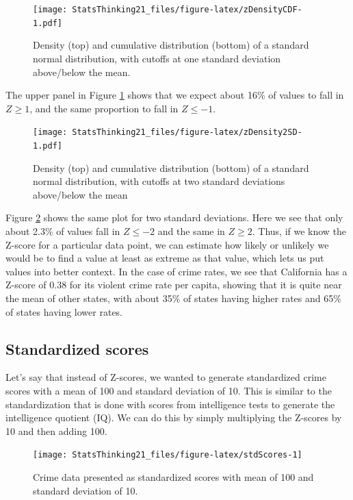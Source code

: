 \documentclass[
  12pt,
]{book}
\begin{document}
\begin{figure}
\centering
\texttt{[image: StatsThinking21\_files/figure-latex/zDensityCDF-1.pdf]}
\caption{\label{fig:zDensityCDF}Density (top) and cumulative distribution (bottom) of a standard normal distribution, with cutoffs at one standard deviation above/below the mean.}
\end{figure}

The upper panel in Figure \ref{fig:zDensityCDF} shows that we expect about 16\% of values to fall in \(Z\ge 1\), and the same proportion to fall in \(Z\le -1\).

\begin{figure}
\centering
\texttt{[image: StatsThinking21\_files/figure-latex/zDensity2SD-1.pdf]}
\caption{\label{fig:zDensity2SD}Density (top) and cumulative distribution (bottom) of a standard normal distribution, with cutoffs at two standard deviations above/below the mean}
\end{figure}

Figure \ref{fig:zDensity2SD} shows the same plot for two standard deviations. Here we see that only about 2.3\% of values fall in \(Z \le -2\) and the same in \(Z \ge 2\). Thus, if we know the Z-score for a particular data point, we can estimate how likely or unlikely we would be to find a value at least as extreme as that value, which lets us put values into better context. In the case of crime rates, we see that California has a Z-score of 0.38 for its violent crime rate per capita, showing that it is quite near the mean of other states, with about 35\% of states having higher rates and 65\% of states having lower rates.

\hypertarget{standardized-scores}{%
\subsection{Standardized scores}\label{standardized-scores}}

Let's say that instead of Z-scores, we wanted to generate standardized crime scores with a mean of 100 and standard deviation of 10. This is similar to the standardization that is done with scores from intelligence tests to generate the intelligence quotient (IQ). We can do this by simply multiplying the Z-scores by 10 and then adding 100.

\begin{figure}
\texttt{[image: StatsThinking21\_files/figure-latex/stdScores-1]} \caption{Crime data presented as standardized scores with mean of  100 and standard deviation of 10.}\label{fig:stdScores}
\end{figure}
\end{document}

